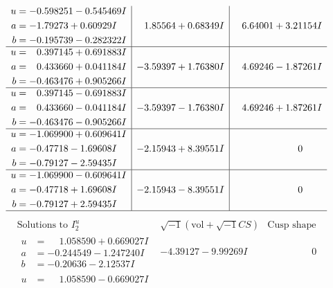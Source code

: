 \documentclass[1p]{elsarticle_modified}
\theoremstyle{definition}
\newcommand{\I}{\sqrt{-1}}
\begin{document}
$$\begin{array}{c|c|c}
\begin{aligned}
u &= -0.598251 - 0.545469 I \\
a &= -1.79273 + 0.60929 I \\
b &= -0.195739 - 0.282322 I\end{aligned}
 & \phantom{-}1.85564 + 0.68349 I & \phantom{-}6.64001 + 3.21154 I \\ \hline\begin{aligned}
u &= \phantom{-}0.397145 + 0.691883 I \\
a &= \phantom{-}0.433660 + 0.041184 I \\
b &= -0.463476 + 0.905266 I\end{aligned}
 & -3.59397 + 1.76380 I & \phantom{-}4.69246 - 1.87261 I \\ \hline\begin{aligned}
u &= \phantom{-}0.397145 - 0.691883 I \\
a &= \phantom{-}0.433660 - 0.041184 I \\
b &= -0.463476 - 0.905266 I\end{aligned}
 & -3.59397 - 1.76380 I & \phantom{-}4.69246 + 1.87261 I \\ \hline\begin{aligned}
u &= -1.069900 + 0.609641 I \\
a &= -0.47718 - 1.69608 I \\
b &= -0.79127 - 2.59435 I\end{aligned}
 & -2.15943 + 8.39551 I & \phantom{-0.000000 } 0 \\ \hline\begin{aligned}
u &= -1.069900 - 0.609641 I \\
a &= -0.47718 + 1.69608 I \\
b &= -0.79127 + 2.59435 I\end{aligned}
 & -2.15943 - 8.39551 I & \phantom{-0.000000 } 0\\
 \hline 
 \end{array}$$\newpage$$\begin{array}{c|c|c}  
\text{Solutions to }I^u_{2}& \I (\text{vol} + \sqrt{-1}CS) & \text{Cusp shape}\\
 \hline 
\begin{aligned}
u &= \phantom{-}1.058590 + 0.669027 I \\
a &= -0.244549 - 1.247240 I \\
b &= -0.20636 - 2.12537 I\end{aligned}
 & -4.39127 - 9.99269 I & \phantom{-0.000000 } 0 \\ \hline\begin{aligned}
u &= \phantom{-}1.058590 - 0.669027 I \\

\end{aligned}
\end{array}$$
\end{document}
